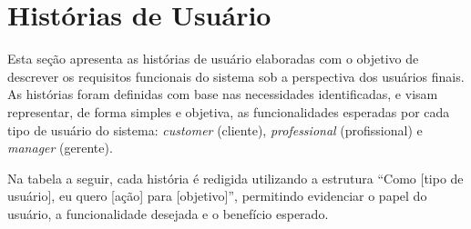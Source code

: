 \section{Histórias de Usuário}

Esta seção apresenta as histórias de usuário elaboradas com o objetivo de descrever os requisitos funcionais do sistema sob a perspectiva dos usuários finais. As histórias foram definidas com base nas necessidades identificadas, e visam representar, de forma simples e objetiva, as funcionalidades esperadas por cada tipo de usuário do sistema: \textit{customer} (cliente), \textit{professional} (profissional) e \textit{manager} (gerente). 

Na tabela a seguir, cada história é redigida utilizando a estrutura “Como [tipo de usuário], eu quero [ação] para [objetivo]”, permitindo evidenciar o papel do usuário, a funcionalidade desejada e o benefício esperado.


